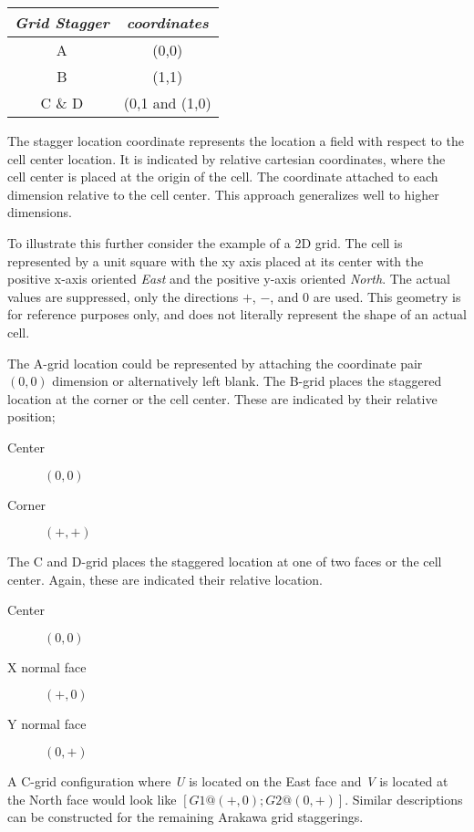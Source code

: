 \begin{center}
\begin{tabular}{| c | c |} \hline \hline
{\em Grid Stagger } & {\em coordinates} \\
\hline
A & (0,0) \\
 B & (1,1) \\
 C \& D & (0,1 and (1,0) \\
\hline 
\end{tabular}
\end{center}
The stagger location coordinate represents the location a field with respect to the cell center location. It is indicated by relative cartesian coordinates, where the cell center is placed at the origin of the cell. The coordinate attached to each dimension relative to the cell center. This approach generalizes well to higher dimensions. 

To illustrate this further consider the example of a 2D grid. The cell is represented by a unit square with the xy axis placed at its center with the positive x-axis oriented {\em East} and the positive y-axis oriented {\em North}. The actual values are suppressed, only the directions $+$, $-$, and $0$ are used. This geometry is for reference purposes only, and does not literally represent the shape of an actual cell. 

The A-grid location could be represented by attaching the coordinate pair $(0,0)$ dimension or alternatively left blank. The B-grid places the staggered location at the corner or the cell center. These are indicated by their relative position;
\begin{description}
	\item [Center] $(0,0)$
	\item [Corner] $(+,+)$
\end{description}  
The C and D-grid places the staggered location at one of two faces or the cell center. Again, these are indicated their relative location.
\begin{description}
	\item [Center] $(0,0)$
	\item [X normal face] $(+,0)$
	\item [Y normal face] $(0,+)$
\end{description}  

A C-grid configuration where {\em U} is located on the East face and {\em V} is located at the North face would look like $[ G1 @(+,0) ; G2 @ (0,+)]$. Similar descriptions can be constructed for the remaining Arakawa grid staggerings. 

